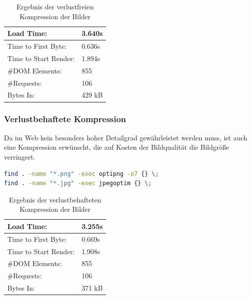 \begin{table}[!ht]
\centering
\caption{Ergebnis der verlustfreien Kompression der Bilder}
    \begin{tabular}{ | p{3cm} | p{1.5cm} | }
    \hline
    Load Time: 			& 3.640s 	\\ \hline
    Time to First Byte:		& 0.636s  	\\ \hline
    Time to Start Render:	& 1.894s	\\ \hline
    \#DOM Elements:		& 855 		\\ \hline
    \#Requests:			& 106 		\\ \hline
    Bytes In:			& 429 kB 	\\ \hline
    \hline
    \end{tabular}
\end{table}

\subsubsection{Verlustbehaftete Kompression}
Da im Web kein besonders hoher Detailgrad gewährleistet werden muss, ist auch eine Kompression erwünscht, die auf Kosten der Bildqualität die Bildgröße verringert. 

\begin{minipage}[t]{1\textwidth}
\begin{lstlisting}[language=bash,label=verlustbehaftets Optimieren mit find,caption= verlustbehaftetes Optimieren mit find]
find . -name "*.png" -exec optipng -o7 {} \;
find . -name "*.jpg" -exec jpegoptim {} \;
\end{lstlisting}
\end{minipage}

\begin{table}[!ht]
\centering
\caption{Ergebnis der verlustbehafteten Kompression der Bilder}
    \begin{tabular}{ | p{3cm} | p{1.5cm} | }
    \hline
    Load Time: 			& 3.255s 	\\ \hline
    Time to First Byte:		& 0.669s  	\\ \hline
    Time to Start Render:	& 1.908s	\\ \hline
    \#DOM Elements:		& 855 		\\ \hline
    \#Requests:			& 106 		\\ \hline
    Bytes In:			& 371 kB 	\\ \hline
    \hline
    \end{tabular}
\end{table}

